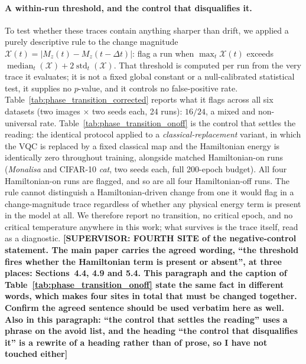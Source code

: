 \documentclass[11pt]{article}
\begin{document}
\paragraph{A within-run threshold, and the control that disqualifies it.} To test whether these traces contain anything sharper than drift, we applied a purely descriptive rule to the change magnitude $\mathcal{X}(t)=|M_z(t)-M_z(t-\Delta t)|$: flag a run when $\max_t \mathcal{X}(t)$ exceeds $\operatorname{median}_t(\mathcal{X}) + 2\operatorname{std}_t(\mathcal{X})$. That threshold is computed per run from the very trace it evaluates; it is not a fixed global constant or a null-calibrated statistical test, it supplies no $p$-value, and it controls no false-positive rate. Table~\ref{tab:phase_transition_corrected} reports what it flags across all six datasets (two images $\times$ two seeds each, 24 runs): $16/24$, a mixed and non-universal rate. Table~\ref{tab:phase_transition_onoff} is the control that settles the reading: the identical protocol applied to a \emph{classical-replacement} variant, in which the VQC is replaced by a fixed classical map and the Hamiltonian energy is identically zero throughout training, alongside matched Hamiltonian-on runs (\textit{Monalisa} and CIFAR-10 \textit{cat}, two seeds each, full 200-epoch budget). All four Hamiltonian-on runs are flagged, and so are all four Hamiltonian-off runs. The rule cannot distinguish a Hamiltonian-driven change from one it would flag in a change-magnitude trace regardless of whether any physical energy term is present in the model at all. We therefore report no transition, no critical epoch, and no critical temperature anywhere in this work; what survives is the trace itself, read as a diagnostic. {\color{red}\textbf{[SUPERVISOR: FOURTH SITE of the negative-control statement. The main paper carries the agreed wording, ``the threshold fires whether the Hamiltonian term is present or absent'', at three places: Sections~4.4, 4.9 and 5.4. This paragraph and the caption of Table~\ref{tab:phase_transition_onoff} state the same fact in different words, which makes four sites in total that must be changed together. Confirm the agreed sentence should be used verbatim here as well. Also in this paragraph: ``the control that settles the reading'' uses a phrase on the avoid list, and the heading ``the control that disqualifies it'' is a rewrite of a heading rather than of prose, so I have not touched either]}}
\end{document}
